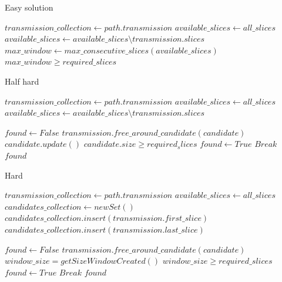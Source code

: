 \documentclass[11pt,a4paper]{article}
\begin{document}
\begin{algorithm}
\caption{Easy solution}\label{easy_case}
\begin{algorithmic}[1]
	\State $transmission\_collection\gets path.transmission$
	\State $available\_slices\gets all\_slices$
      \State $available\_slices \gets available\_slices\setminus transmission.slices$
	\EndFor
	\State $max\_window \gets max\_consecutive\_slices(available\_slices)$
	\State \Return $max\_window \geq required\_slices$
\EndProcedure
\end{algorithmic}
\end{algorithm}

\begin{algorithm}
\caption{Half hard}\label{half_hard}
\begin{algorithmic}[1]
	\State $transmission\_collection\gets path.transmission$
	\State $available\_slices\gets all\_slices$
      \State $available\_slices \gets available\_slices\setminus transmission.slices$
	\EndFor
	
	\State $found \gets False$
			\State $transmission.free\_around\_candidate(candidate)$
		\EndFor
		\State $candidate.update()$
		\If $candidate.size \geq required_slices$
			\State $found \gets True$
			\State $Break$
		\EndIf
	\EndFor
	\State \Return $found$
\EndProcedure
\end{algorithmic}
\end{algorithm}

\begin{algorithm}
\caption{Hard}\label{hard}
\begin{algorithmic}[1]
	\State $transmission\_collection\gets path.transmission$
	\State $available\_slices\gets all\_slices$
	\State $candidates\_collection\gets new Set()$
      \State $candidates\_collection.insert(transmission.first\_slice)$
      \State $candidates\_collection.insert(transmission.last\_slice)$
	\EndFor
	
	\State $found \gets False$
			\State $transmission.free\_around\_candidate(candidate)$
		\EndFor
		\State $window\_size=getSizeWindowCreated()$
		\If $window\_size \geq required\_slices$
			\State $found \gets True$
			\State $Break$
		\EndIf
	\EndFor
	\State \Return $found$
\EndProcedure
\end{algorithmic}
\end{algorithm}
\end{document}
